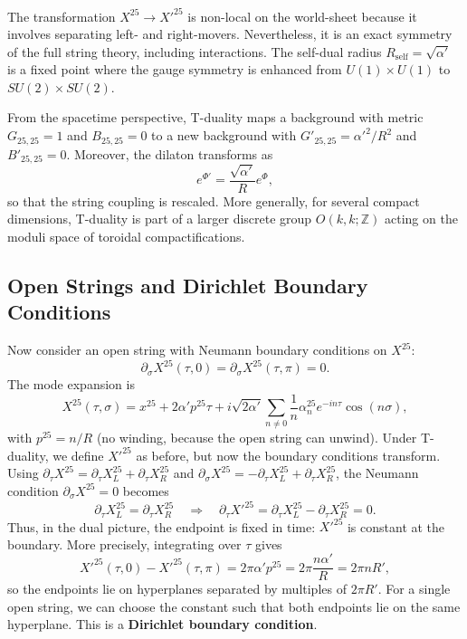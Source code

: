 \documentclass[11pt]{article}
\begin{document}
The transformation $X^{25} \to X'^{25}$ is non-local on the world-sheet because it involves separating left- and right-movers. Nevertheless, it is an exact symmetry of the full string theory, including interactions. The self-dual radius $R_{\text{self}} = \sqrt{\alpha'}$ is a fixed point where the gauge symmetry is enhanced from $U(1)\times U(1)$ to $SU(2)\times SU(2)$.

From the spacetime perspective, T-duality maps a background with metric $G_{25,25}=1$ and $B_{25,25}=0$ to a new background with $G'_{25,25}= \alpha'^2/R^2$ and $B'_{25,25}=0$. Moreover, the dilaton transforms as
\begin{equation}
e^{\Phi'} = \frac{\sqrt{\alpha'}}{R} e^{\Phi},
\end{equation}
so that the string coupling is rescaled. More generally, for several compact dimensions, T-duality is part of a larger discrete group $O(k,k;\mathbb{Z})$ acting on the moduli space of toroidal compactifications.

\subsection{Open Strings and Dirichlet Boundary Conditions}

Now consider an open string with Neumann boundary conditions on $X^{25}$:
\begin{equation}
\partial_\sigma X^{25}(\tau,0) = \partial_\sigma X^{25}(\tau,\pi) = 0.
\end{equation}
The mode expansion is
\begin{equation}
X^{25}(\tau,\sigma) = x^{25} + 2\alpha' p^{25} \tau + i\sqrt{2\alpha'} \sum_{n\neq0} \frac{1}{n} \alpha_n^{25} e^{-in\tau} \cos(n\sigma),
\end{equation}
with $p^{25} = n/R$ (no winding, because the open string can unwind). Under T-duality, we define $X'^{25}$ as before, but now the boundary conditions transform. Using $\partial_\tau X^{25} = \partial_\tau X_L^{25} + \partial_\tau X_R^{25}$ and $\partial_\sigma X^{25} = -\partial_\tau X_L^{25} + \partial_\tau X_R^{25}$, the Neumann condition $\partial_\sigma X^{25}=0$ becomes
\begin{equation}
\partial_\tau X_L^{25} = \partial_\tau X_R^{25} \quad \Longrightarrow \quad \partial_\tau X'^{25} = \partial_\tau X_L^{25} - \partial_\tau X_R^{25} = 0.
\end{equation}
Thus, in the dual picture, the endpoint is fixed in time: $X'^{25}$ is constant at the boundary. More precisely, integrating over $\tau$ gives
\begin{equation}
X'^{25}(\tau,0) - X'^{25}(\tau,\pi) = 2\pi \alpha' p^{25} = 2\pi \frac{n\alpha'}{R} = 2\pi n R',
\end{equation}
so the endpoints lie on hyperplanes separated by multiples of $2\pi R'$. For a single open string, we can choose the constant such that both endpoints lie on the same hyperplane. This is a \textbf{Dirichlet boundary condition}.
\end{document}
